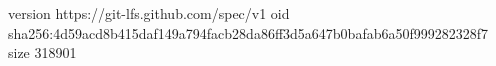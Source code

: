 version https://git-lfs.github.com/spec/v1
oid sha256:4d59acd8b415daf149a794facb28da86ff3d5a647b0bafab6a50f999282328f7
size 318901

